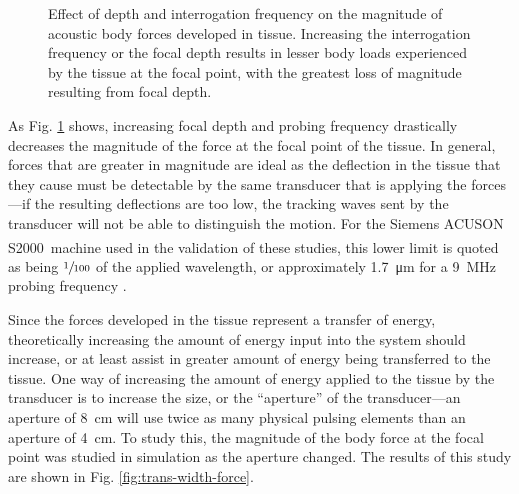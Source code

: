 			\begin{figure}[!htb]
				\centering
				\caption[Effect of depth and interrogation frequency on magnitude of acoustic body forces]{Effect of depth and interrogation frequency on the magnitude of acoustic body forces developed in tissue. Increasing the interrogation frequency or the focal depth results in lesser body loads experienced by the tissue at the focal point, with the greatest loss of magnitude resulting from focal depth.}
				\label{fig:freq-depth-force}
			\end{figure}

			As Fig. \ref{fig:freq-depth-force} shows, increasing focal depth and probing frequency drastically decreases the magnitude of the force at the focal point of the tissue. In general, forces that are greater in magnitude are ideal as the deflection in the tissue that they cause must be detectable by the same transducer that is applying the forces---if the resulting deflections are too low, the tracking waves sent by the transducer will not be able to distinguish the motion. For the Siemens ACUSON S2000\textsuperscript{\texttrademark}\ machine used in the validation of these studies, this lower limit is quoted as being $\sfrac{1}{100}$ of the applied wavelength, or approximately \SI{1.7}{\um} for a \SI{9}{\MHz} probing frequency \cite{SiemensVirtualTouch}.

			Since the forces developed in the tissue represent a transfer of energy, theoretically increasing the amount of energy input into the system should increase, or at least assist in greater amount of energy being transferred to the tissue. One way of increasing the amount of energy applied to the tissue by the transducer is to increase the size, or the ``aperture'' of the transducer---an aperture of \SI{8}{\cm} will use twice as many physical pulsing elements than an aperture of \SI{4}{\cm}. To study this, the magnitude of the body force at the focal point was studied in simulation as the aperture changed. The results of this study are shown in Fig. \ref{fig:trans-width-force}.

